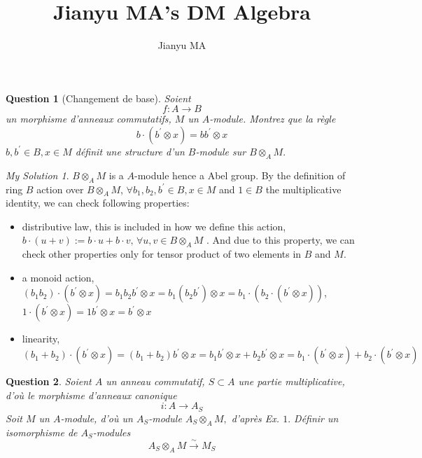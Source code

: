 \documentclass[]{article}
\title{Jianyu MA's DM Algebra}
\author{Jianyu MA}
\newtheorem{prop}{Question}
\theoremstyle{remark}
\newtheorem*{sol}{My Solution}
\begin{document}
\maketitle


\begin{prop}[Changement de base] 
	Soient
	\[ f: A \longrightarrow B \]
	un morphisme d'anneaux commutatifs, $M$ un $A$-module. Montrez que la règle
	\[ b \cdot\left(b^{\prime} \otimes x\right)=b b^{\prime} \otimes x \] $b, b^{\prime} \in B, x \in M$ définit une structure d'un $B$-module sur $B \otimes_{A} M .$
\end{prop}

\begin{sol}
	$B \otimes_{A} M $ is a $A$-module hence a Abel group. By the definition of ring $ B $ action over  $B \otimes_{A} M $,  $ \forall b_1, b_2, b^{\prime} \in B, x \in M $ and $ 1 \in B $ the multiplicative identity, we can check following properties:
		\begin{itemize}
			\item distributive law, this is included in how we define this action,  $ b \cdot (u + v):= b \cdot u + b \cdot v,\, \forall u,v\in B \otimes_{A} M $ . And due to this property, we can check other properties only for tensor product of two elements in $ B $ and $ M $.
			\item a monoid action, $ (b_1 b_2)  \cdot\left(b^{\prime} \otimes x\right)=b_1 b_2 b^{\prime} \otimes x=b_1 (b_2 b^{\prime}) \otimes x = b_1 \cdot (b_2 \cdot (b^{\prime} \otimes x))$, $ 1 \cdot\left(b^{\prime} \otimes x\right)=1 b^{\prime} \otimes x = b^{\prime} \otimes x $
			\item linearity, $ (b_1 + b_2)  \cdot\left(b^{\prime} \otimes x\right)=( b_1 +b_2) b^{\prime} \otimes x =b_1 b^{\prime} \otimes x + b_2 b^{\prime} \otimes x=b_1   \cdot\left(b^{\prime} \otimes x\right) + b_2 \cdot\left(b^{\prime} \otimes x\right)$
			
		\end{itemize}
\end{sol}
\begin{prop}
	Soient $A$ un anneau commutatif, $S \subset A$ une partie multiplicative, d'où le morphisme d'anneaux canonique
	\[ i: A \longrightarrow A_{S} \]
	Soit $M$ un $A$-module, d'où un $A_{S}$-module $A_{S} \otimes_{A} M,$ d'après Ex. $1 .$ Définir un isomorphisme de $A_{S}$-modules \[ A_{S}\otimes_{A}M \stackrel{\sim}{\longrightarrow} M_{S} \]
\end{prop}
\end{document}
